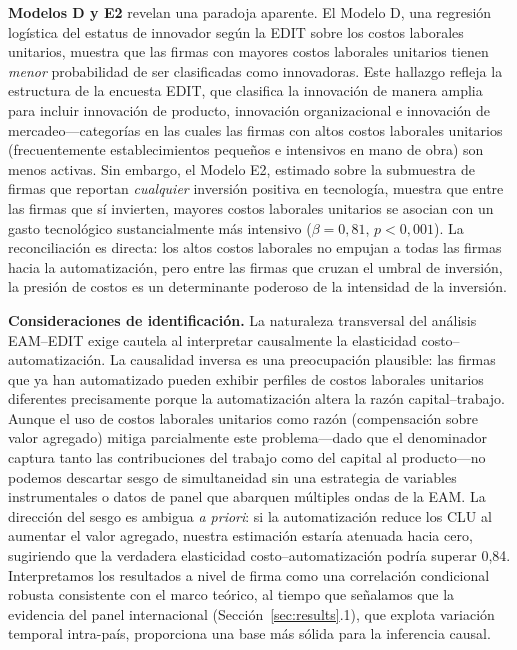 \documentclass{article}
\begin{document}
\textbf{Modelos D y E2} revelan una paradoja aparente. El Modelo D, una regresi\'on log\'istica del estatus de innovador seg\'un la EDIT sobre los costos laborales unitarios, muestra que las firmas con mayores costos laborales unitarios tienen \textit{menor} probabilidad de ser clasificadas como innovadoras. Este hallazgo refleja la estructura de la encuesta EDIT, que clasifica la innovaci\'on de manera amplia para incluir innovaci\'on de producto, innovaci\'on organizacional e innovaci\'on de mercadeo---categor\'ias en las cuales las firmas con altos costos laborales unitarios (frecuentemente establecimientos peque\~nos e intensivos en mano de obra) son menos activas. Sin embargo, el Modelo E2, estimado sobre la submuestra de firmas que reportan \textit{cualquier} inversi\'on positiva en tecnolog\'ia, muestra que entre las firmas que s\'i invierten, mayores costos laborales unitarios se asocian con un gasto tecnol\'ogico sustancialmente m\'as intensivo ($\beta = 0{,}81$, $p < 0{,}001$). La reconciliaci\'on es directa: los altos costos laborales no empujan a todas las firmas hacia la automatizaci\'on, pero entre las firmas que cruzan el umbral de inversi\'on, la presi\'on de costos es un determinante poderoso de la intensidad de la inversi\'on.

\textbf{Consideraciones de identificaci\'on.} La naturaleza transversal del an\'alisis EAM--EDIT exige cautela al interpretar causalmente la elasticidad costo--automatizaci\'on. La causalidad inversa es una preocupaci\'on plausible: las firmas que ya han automatizado pueden exhibir perfiles de costos laborales unitarios diferentes precisamente porque la automatizaci\'on altera la raz\'on capital--trabajo. Aunque el uso de costos laborales unitarios como raz\'on (compensaci\'on sobre valor agregado) mitiga parcialmente este problema---dado que el denominador captura tanto las contribuciones del trabajo como del capital al producto---no podemos descartar sesgo de simultaneidad sin una estrategia de variables instrumentales o datos de panel que abarquen m\'ultiples ondas de la EAM. La direcci\'on del sesgo es ambigua \textit{a priori}: si la automatizaci\'on reduce los CLU al aumentar el valor agregado, nuestra estimaci\'on estar\'ia atenuada hacia cero, sugiriendo que la verdadera elasticidad costo--automatizaci\'on podr\'ia superar 0,84. Interpretamos los resultados a nivel de firma como una correlaci\'on condicional robusta consistente con el marco te\'orico, al tiempo que se\~nalamos que la evidencia del panel internacional (Secci\'on~\ref{sec:results}.1), que explota variaci\'on temporal intra-pa\'is, proporciona una base m\'as s\'olida para la inferencia causal.
\end{document}
